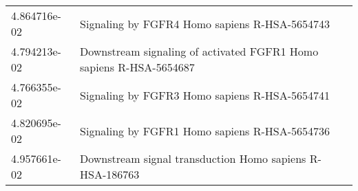 \begin{longtable}{p{2.4cm}p{14.5cm}}
             4.864716e-02 &                                                 Signaling by FGFR4 Homo sapiens R-HSA-5654743 \\
             4.794213e-02 &                            Downstream signaling of activated FGFR1 Homo sapiens R-HSA-5654687 \\
             4.766355e-02 &                                                 Signaling by FGFR3 Homo sapiens R-HSA-5654741 \\
             4.820695e-02 &                                                 Signaling by FGFR1 Homo sapiens R-HSA-5654736 \\
             4.957661e-02 &                                      Downstream signal transduction Homo sapiens R-HSA-186763 \\
\end{longtable}


